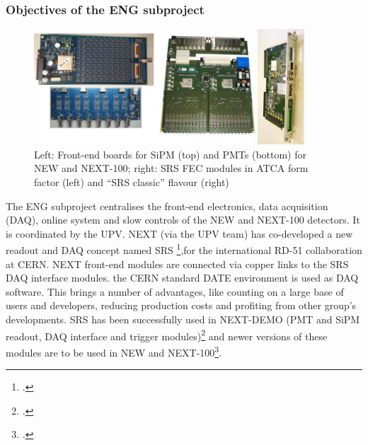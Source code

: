 %
%

\subsubsection*{Objectives of the ENG subproject}

\begin{figure}[h!]
\begin{center}
\includegraphics[width=0.9\textwidth]{img/Electronics.jpg}
\end{center}
\caption{\label{Fig:FEE} Left: Front-end boards for SiPM (top) and PMTs (bottom) for NEW and NEXT-100; right: SRS FEC modules in ATCA form factor (left) and “SRS classic” flavour (right) }
\end{figure}

The ENG subproject centralises the front-end electronics, data acquisition (DAQ), online system and slow controls of the NEW and NEXT-100 detectors. It is coordinated by the UPV.
NEXT (via the UPV team) has co-developed a new readout and DAQ concept named SRS \footcite{Toledo2011,SRS2013},for the international RD-51 collaboration at CERN. NEXT front-end modules are connected via copper links to the SRS DAQ interface modules. the CERN standard DATE environment is used as DAQ software. This brings a number of advantages, like counting on a large base of users and developers, reducing production costs and profiting from other group’s developments. SRS has been successfully used in NEXT-DEMO (PMT and SiPM readout, DAQ interface and trigger modules)\footcite{Gil2012,Herrero2012,Esteve2012} and newer versions of these modules are to be used in NEW and NEXT-100\footcite{TWEPP2014}.

